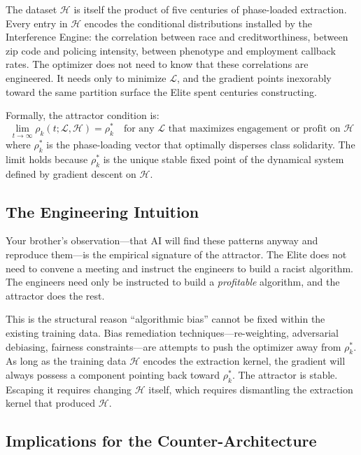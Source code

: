 The dataset $\mathcal{H}$ is itself the product of five centuries of phase-loaded extraction. Every entry in $\mathcal{H}$ encodes the conditional distributions installed by the Interference Engine: the correlation between race and creditworthiness, between zip code and policing intensity, between phenotype and employment callback rates. The optimizer does not need to know that these correlations are engineered. It needs only to minimize $\mathcal{L}$, and the gradient points inexorably toward the same partition surface the Elite spent centuries constructing.

Formally, the attractor condition is:
\begin{equation}\label{eq:14.1b-attractor-condition}
\lim_{t \to \infty} \rho_k(t; \mathcal{L}, \mathcal{H}) = \rho_k^* \quad \text{for any } \mathcal{L} \text{ that maximizes engagement or profit on } \mathcal{H}
\end{equation}
where $\rho_k^*$ is the phase-loading vector that optimally disperses class solidarity. The limit holds because $\rho_k^*$ is the unique stable fixed point of the dynamical system defined by gradient descent on $\mathcal{H}$.

\subsection{The Engineering Intuition}

Your brother's observation---that AI will find these patterns anyway and reproduce them---is the empirical signature of the attractor. The Elite does not need to convene a meeting and instruct the engineers to build a racist algorithm. The engineers need only be instructed to build a \textit{profitable} algorithm, and the attractor does the rest.

This is the structural reason ``algorithmic bias'' cannot be fixed within the existing training data. Bias remediation techniques---re-weighting, adversarial debiasing, fairness constraints---are attempts to push the optimizer away from $\rho_k^*$. As long as the training data $\mathcal{H}$ encodes the extraction kernel, the gradient will always possess a component pointing back toward $\rho_k^*$. The attractor is stable. Escaping it requires changing $\mathcal{H}$ itself, which requires dismantling the extraction kernel that produced $\mathcal{H}$.

\subsection{Implications for the Counter-Architecture}

